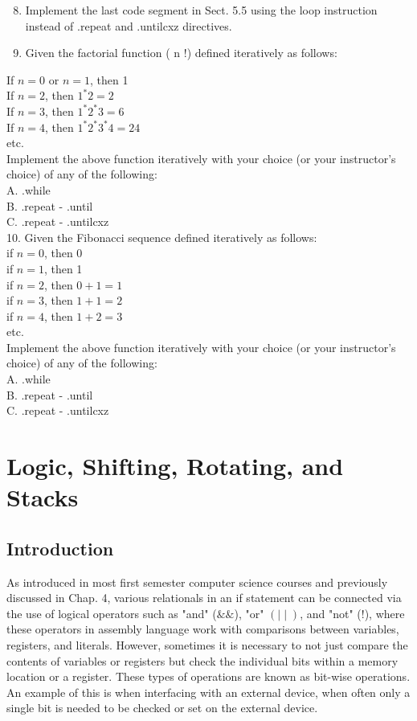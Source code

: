 \documentclass[10pt]{book}
\begin{document}
\begin{enumerate}
  \setcounter{enumi}{7}
  \item Implement the last code segment in Sect. 5.5 using the loop instruction instead of .repeat and .untilcxz directives.
  \item Given the factorial function ( n !) defined iteratively as follows:
\end{enumerate}
If $n=0$ or $n=1$, then 1\\
If $n=2$, then $1^{*} 2=2$\\
If $n=3$, then $1^{*} 2^{*} 3=6$\\
If $n=4$, then $1^{*} 2^{*} 3^{*} 4=24$\\
etc.\\
Implement the above function iteratively with your choice (or your instructor's choice) of any of the following:\\
A. .while\\
B. .repeat - .until\\
C. .repeat - .untilcxz\\
10. Given the Fibonacci sequence defined iteratively as follows:\\
if $n=0$, then 0\\
if $n=1$, then 1\\
if $n=2$, then $0+1=1$\\
if $n=3$, then $1+1=2$\\
if $n=4$, then $1+2=3$\\
etc.\\
Implement the above function iteratively with your choice (or your instructor's choice) of any of the following:\\
A. .while\\
B. .repeat - .until\\
C. .repeat - .untilcxz

\section{Logic, Shifting, Rotating, and Stacks}
\subsection{Introduction}
As introduced in most first semester computer science courses and previously discussed in Chap. 4, various relationals in an if statement can be connected via the use of logical operators such as "and" ($\&\&$), "or" $(\mid\mid)$, and "not" (!), where these operators in assembly language work with comparisons between variables, registers, and literals. However, sometimes it is necessary to not just compare the contents of variables or registers but check the individual bits within a memory location or a register. These types of operations are known as bit-wise operations. An example of this is when interfacing with an external device, when often only a single bit is needed to be checked or set on the external device.
\end{document}
